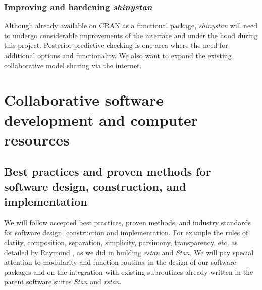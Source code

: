 \documentclass[11pt,notitlepage]{article}
\begin{document}
\subsubsection*{Improving and hardening \textit{shinystan}}
Although already available on 
\href{https://cran.r-project.org/web/packages/shinystan/index.html}{CRAN} 
as a functional \href{https://www.youtube.com/watch?v=X31xqNHcvQs}{package},
\textit{shinystan} will need to undergo considerable improvements of the 
interface and under the hood during this project. Posterior predictive 
checking is one area where the need for additional options and functionality. 
We also want to expand the existing collaborative model sharing via the internet.

\section*{Collaborative software development and computer resources}
\subsection*{Best practices and proven methods for software design, construction, and implementation}
We will follow accepted best practices, proven methods, and industry standards for software design, construction and implementation.
For example the rules of clarity, composition, separation, simplicity, parsimony, transparency, etc. as detailed by 
Raymond \cite{Raymond2003art}, as we did in building \textit{rstan} and \textit{Stan}. We will pay special attention to modularity 
and function routines in the design of our software packages and on the integration with existing subroutines already written in the 
parent software suites \textit{Stan} and \textit{rstan}. 
\end{document}
